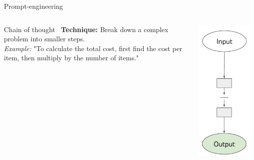 \documentclass[presentation, 10pt]{beamer}\mode<presentation>{\usetheme{AMSBolognaFC}}
\begin{document}
\begin{frame}[allowframebreaks]{Prompt-engineering}
\begin{columns}
\begin{column}{0.75\textwidth}
	\begin{exampleblock}{Chain of thought~\cite{DBLP:conf/nips/Wei0SBIXCLZ22}}
		\textbf{Technique:} Break down a complex problem into smaller steps. \\
		\emph{Example:} "To calculate the total cost, first find the cost per item, then multiply by the number of items."
		\end{exampleblock}
\end{column}
\begin{column}{0.2\textwidth}
	\centering
	\includegraphics[width=\textwidth]{img/cot.png}	

\end{column}
\end{columns}
\end{frame}
\end{document}
